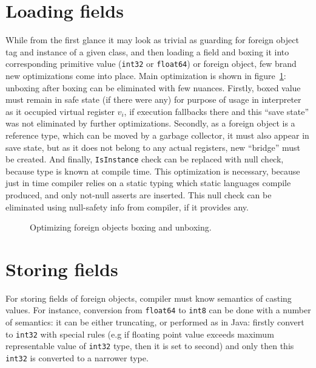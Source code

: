 \documentclass[times, %
	specification,annotation, %
	titlepage-extra-ru,specification-extra-ru,annotation-extra-ru, %
	languages={russian,english} %
	]{itmo-student-thesis}
\begin{document}
\section{Loading fields}
While from the first glance it may look as trivial as guarding for foreign object tag and instance of a given class, and then loading a field and boxing it into corresponding primitive value (\texttt{int32} or \texttt{float64}) or foreign object, few brand new optimizations come into place. Main optimization is shown in figure~\ref{fig:field-opt}: unboxing after boxing can be eliminated with few nuances. Firstly, boxed value must remain in safe state (if there were any) for purpose of usage in interpreter as it occupied virtual register $v_i$, if execution fallbacks there and this ``save state'' was not eliminated by further optimizations. Secondly, as a foreign object is a reference type, which can be moved by a garbage collector, it must also appear in save state, but as it does not belong to any actual registers, new ``bridge'' must be created. And finally, \texttt{IsInstance} check can be replaced with null check, because type is known at compile time. This optimization is necessary, because just in time compiler relies on a static typing which static languages compile produced, and only not-null asserts are inserted. This null check can be eliminated using null-safety info from compiler, if it provides any.
\begin{figure}[H]
	\caption{Optimizing foreign objects boxing and unboxing.}\label{fig:field-opt}
	\centering
	\end{figure}

\section{Storing fields}
For storing fields of foreign objects, compiler must know semantics of casting values. For instance, conversion from \texttt{float64} to \texttt{int8} can be done with a number of semantics: it can be either truncating, or performed as in Java: firstly convert to \texttt{int32} with special rules (e.g if floating point value exceeds maximum representable value of \texttt{int32} type, then it is set to second) and only then this \texttt{int32} is converted to a narrower type.
\end{document}
